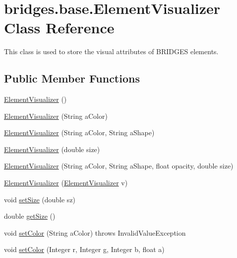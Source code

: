 \hypertarget{classbridges_1_1base_1_1_element_visualizer}{}\section{bridges.\+base.\+Element\+Visualizer Class Reference}
\label{classbridges_1_1base_1_1_element_visualizer}


This class is used to store the visual attributes of B\+R\+I\+D\+G\+ES elements.  


\subsection*{Public Member Functions}
\begin{DoxyCompactItemize}
\item 
\hyperlink{classbridges_1_1base_1_1_element_visualizer_acbca874876ec1e8dbbde6484a4fc056e}{Element\+Visualizer} ()
\item 
\hyperlink{classbridges_1_1base_1_1_element_visualizer_a5c0d9fe8051ebc816372b9836689fdfa}{Element\+Visualizer} (String a\+Color)
\item 
\hyperlink{classbridges_1_1base_1_1_element_visualizer_ab62b1b06907fbeddfcee2b4b297e1021}{Element\+Visualizer} (String a\+Color, String a\+Shape)
\item 
\hyperlink{classbridges_1_1base_1_1_element_visualizer_ab32f66b72ccf0a26c03ba44006da9ac6}{Element\+Visualizer} (double size)
\item 
\hyperlink{classbridges_1_1base_1_1_element_visualizer_a9bf06ca1b6c215e079ab33ccd99633e8}{Element\+Visualizer} (String a\+Color, String a\+Shape, float opacity, double size)
\item 
\hyperlink{classbridges_1_1base_1_1_element_visualizer_a5b48cbda94a4e84e40de41fe156e2497}{Element\+Visualizer} (\hyperlink{classbridges_1_1base_1_1_element_visualizer}{Element\+Visualizer} v)
\item 
void \hyperlink{classbridges_1_1base_1_1_element_visualizer_aba410184f7df495594fc1fa7948335a5}{set\+Size} (double sz)
\item 
double \hyperlink{classbridges_1_1base_1_1_element_visualizer_a0b7673bf724e3df1f94df50ad95ca5b1}{get\+Size} ()
\item 
void \hyperlink{classbridges_1_1base_1_1_element_visualizer_ae24d6c51ba22481c3dbfc0dd512c0a32}{set\+Color} (String a\+Color)  throws Invalid\+Value\+Exception
\item 
void \hyperlink{classbridges_1_1base_1_1_element_visualizer_a84fad1c8abe43b20c68c1800d7630918}{set\+Color} (Integer r, Integer g, Integer b, float a)

\end{DoxyCompactItemize}
